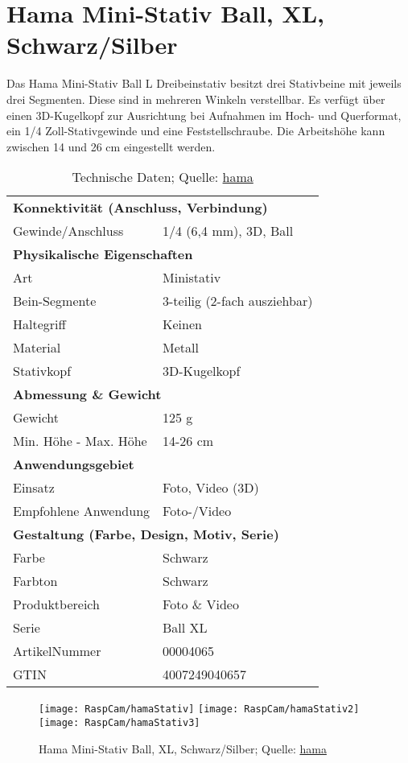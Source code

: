 \section{Hama Mini-Stativ \glqq Ball\grqq, XL, Schwarz/Silber}

Das Hama Mini-Stativ Ball L Dreibeinstativ besitzt drei Stativbeine mit jeweils drei Segmenten. Diese sind in mehreren Winkeln verstellbar. Es verfügt über einen 3D-Kugelkopf zur  Ausrichtung bei Aufnahmen im Hoch- und Querformat, ein 1/4 Zoll-Stativgewinde und eine Feststellschraube. Die Arbeitshöhe kann zwischen 14 und 26 cm eingestellt werden. 

\begin{table}
\begin{tabular}{ll}
\multicolumn{2}{l}{\textbf{Konnektivität (Anschluss, Verbindung)}} \\
Gewinde/Anschluss & 	1/4\grqq{} (6,4 mm), 3D, Ball\\
\multicolumn{2}{l}{\textbf{Physikalische Eigenschaften}} \\
Art	&  Ministativ\\
Bein-Segmente & 	3-teilig (2-fach ausziehbar) \\
Haltegriff & 	Keinen \\
Material & 	Metall \\
Stativkopf	& 3D-Kugelkopf\\
\multicolumn{2}{l}{\textbf{Abmessung \& Gewicht}} \\
Gewicht & 	125 g \\
Min. Höhe - Max. Höhe & 	14-26 cm\\
\multicolumn{2}{l}{\textbf{Anwendungsgebiet}} \\
Einsatz	 & Foto, Video (3D) \\
Empfohlene Anwendung & 	Foto-/Video\\
\multicolumn{2}{l}{\textbf{Gestaltung (Farbe, Design, Motiv, Serie) }}\\
Farbe &	Schwarz\\
Farbton & 	Schwarz \\
Produktbereich	& Foto \& Video \\
Serie & 	Ball XL\\
ArtikelNummer & 00004065\\
GTIN &  4007249040657 \\
\end{tabular}

\caption[Technische Daten des Stativs]{Technische Daten; Quelle: \href{https://de.hama.com/00004065/hama-mini-stativ-ball-xl-schwarz-silber}{hama} }
\end{table}

\begin{figure}
  \texttt{[image: RaspCam/hamaStativ]}
  \quad 
  \texttt{[image: RaspCam/hamaStativ2]}
  \quad
  \texttt{[image: RaspCam/hamaStativ3]}

  \caption[Hama Mini-Stativ \glqq Ball\grqq, XL, Schwarz/Silber]{Hama Mini-Stativ \glqq Ball\grqq, XL, Schwarz/Silber; Quelle: \href{https://de.hama.com/00004065/hama-mini-stativ-ball-xl-schwarz-silber}{hama}}
\end{figure}
